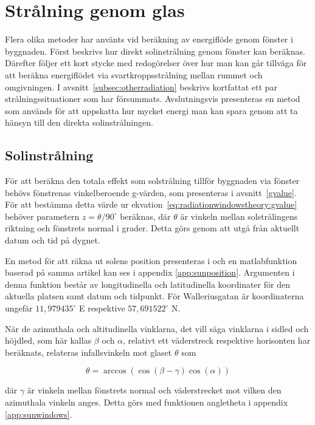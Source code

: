\section{Strålning genom glas}\label{sec:sunthroughwindowsmethod}

Flera olika metoder har använts vid beräkning av energiflöde genom fönster i byggnaden. Först beskrivs hur direkt solinstrålning genom fönster kan beräknas. Därefter följer ett kort stycke med redogörelser över hur man kan går tillväga för att beräkna energiflödet via svartkroppsstrålning mellan rummet och omgivningen. I avsnitt~\ref{subsec:otherradiation} beskrivs kortfattat ett par strålningssituationer som har försummats. Avslutningsvis presenteras en metod som används för att uppskatta hur mycket energi man kan spara genom att ta hänsyn till den direkta solinstrålningen.

\subsection{Solinstrålning}
För att beräkna den totala effekt som solstrålning tillför byggnaden via fönster behövs fönstrenas vinkelberoende g-värden, som presenteras i avsnitt~\ref{gvalue}. För att bestämma detta värde ur ekvation~\eqref{eq:radiationwindowstheory:gvalue} behöver parametern $z = \theta/90^\circ$ beräknas, där $\theta$ är vinkeln mellan solstrålingens riktning och fönstrets normal i grader. Detta görs genom att utgå från aktuellt datum och tid på dygnet.

En metod för att räkna ut solens position presenteras i \cite{walraven78} och en matlabfunktion baserad på samma artikel kan ses i appendix \ref{app:sunposition}. Argumenten i denna funktion består av longitudinella och latitudinella koordinater för den aktuella platsen samt datum och tidpunkt. För Walleriusgatan är koordinaterna ungefär $11,979435^\circ$ E respektive $57,691522^\circ$ N.

När de azimuthala och altitudinella vinklarna, det vill säga vinklarna i sidled och höjdled, som här kallas $\beta$ och $\alpha$, relativt ett väderstreck respektive horisonten har beräknats, relateras infallsvinkeln mot glaset $\theta$ som

\begin{equation} 
\theta = \arccos{\left( \cos{\left(\beta - \gamma\right)}\cos{\left(\alpha\right)}\right)}
\end{equation}

där $\gamma$ är vinkeln mellan fönstrets normal och väderstrecket mot vilken den azimuthala vinkeln anges. Detta görs med funktionen angletheta i appendix \ref{app:sunwindows}.

